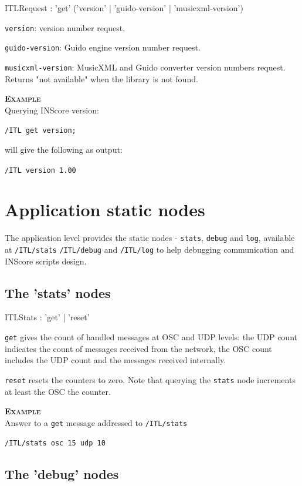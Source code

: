 \documentclass[a4paper,twoside]{report}
\newcommand{\sublevel}[1]	{\section{#1}}
\newcommand{\subsublevel}[1]	{\subsection{#1}}
\newcommand{\OSC}[1]		{\texttt{#1}}
\newcommand{\example}		{\textbf{\hspace{-1.5cm}\textbf{\textsc{Example }}}}
\let\olditemize\itemize
\let\oldenditemize\enditemize
\renewenvironment{itemize} 	{\olditemize \setlength{\itemsep}{1mm}}{\oldenditemize}
\newcommand{\sample}	[1]			{\vspace{-2mm}\begin{center}\colorbox{mygrey}{
								\begin{minipage}[t]{0.9\columnwidth} 
								{\small \texttt{#1}}
								\end{minipage}}\end{center}}
\newcommand{\sampleindent}	{ \hspace{0.5cm} }
\begin{document}
\begin{rail}
ITLRequest : 'get'  ('version' | 'guido-version' | 'musicxml-version')
\end{rail}

\begin{itemize}
\item \OSC{version}: version number request.
\item \OSC{guido-version}: Guido engine version number request.
\item \OSC{musicxml-version}: MusicXML and Guido converter version numbers request. Returns "not available" when the library is not found.

\end{itemize}

\example \\
Querying INScore version:
\sample{/ITL get version;}
\sampleindent will give the following as output:
\sample{/ITL version 1.00}

\sublevel{Application static nodes}
\label{ITLStatic}

The application level provides the static nodes - \OSC{stats}, \OSC{debug} and \OSC{log}, available at \OSC{/ITL/stats} \OSC{/ITL/debug} and \OSC{/ITL/log}  to help debugging communication and INScore scripts design.

\subsublevel{The 'stats' nodes}
\label{ITLstat}

\begin{rail}
ITLStats : 'get'  | 'reset'
\end{rail}

\begin{itemize}
\item \OSC{get} gives the count of handled messages at OSC and UDP levels: the UDP count indicates the count of messages received from the network, the OSC count includes the UDP count and the messages received internally.
\item \OSC{reset} resets the counters to zero. Note that querying the \OSC{stats} node increments at least the OSC the counter.
\end{itemize}

\example \\
Answer to a \OSC{get} message addressed to \OSC{/ITL/stats}
\sample{/ITL/stats osc 15 udp 10}


\subsublevel{The 'debug' nodes}
\label{ITLdebug}
\end{document}

